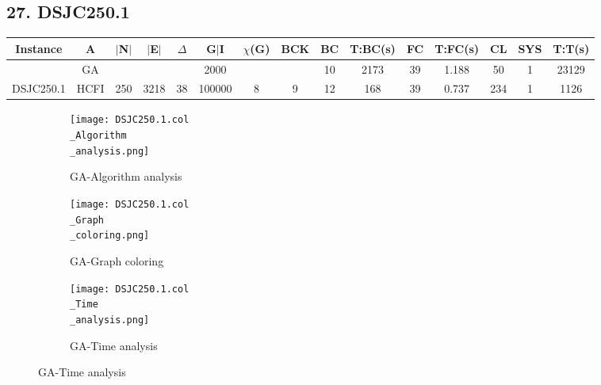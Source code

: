 \documentclass[10pt]{article}
\begin{document}
\subsection*{\hspace{0,9073976cm} 27. DSJC250.1 }
\begin{table}[H]
\centering
\begin{tabular}{|c|c|c|c|c|c|c|c|c|c|c|c|c|c|c|}
\hline
Instance& A &$|$N$|$ & $|$E$|$ & $\Delta$ & G$|$I & $\chi$(G) &BCK&BC & T:BC(s) & FC & T:FC(s) & CL & SYS & T:T(s) \\ \hline \hline

	&GA&       &                   &                     &    2000     &     \cellcolor{yellow} & {\cellcolor{yellow}}& {{\cellcolor{green}10}}
&2173   &39        &1.188                   &50                    &1          &23129        \\ \cline{2-2} \cline{6-6} \cline{9-15}
 \multirow{-2}{*}{DSJC250.1} &HCFI   &\multirow{-2}{*}{250}   &\multirow{-2}{*}{3218}     &\multirow{-2}{*}{38}     &100000     &\multirow{-2}{*}{\cellcolor{yellow}8}      & \multirow{-2}{*}{\cellcolor{yellow}9}    &{\cellcolor{green}12}     &168         &39    &0.737         &234    &1     &1126        \\ \hline 
\end{tabular}
\end{table}
\graphicspath{{./Core1/Solutions/GA/DSJC250.1.col}}
\begin{figure}[H]
\begin{subfigure}{.33\textwidth}
  \centering
  \texttt{[image: DSJC250.1.col\\\_Algorithm\\\_analysis.png]}
  \caption{GA-Algorithm analysis}
   \label{fig:subfig1}
\end{subfigure}%
\begin{subfigure}{.33\textwidth}
  \centering
  \texttt{[image: DSJC250.1.col\\\_Graph\\\_coloring.png]}
  \caption{GA-Graph coloring}
  \label{fig:subfig2}
\end{subfigure}
\begin{subfigure}{.33\textwidth}
  \centering
  \texttt{[image: DSJC250.1.col\\\_Time\\\_analysis.png]}
  \caption{GA-Time analysis}
  \end{subfigure}
\end{figure}
\end{document}
